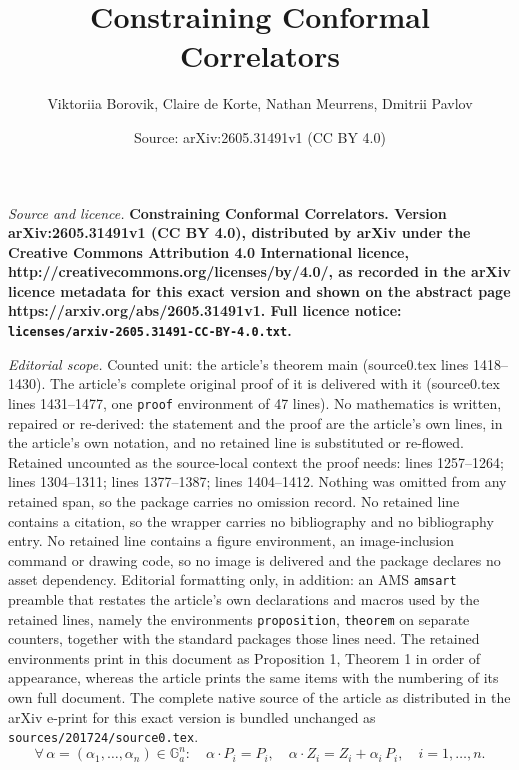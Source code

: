 \documentclass[10pt,a4paper]{amsart}
\title{\bf Constraining Conformal Correlators}
\author{Viktoriia Borovik, Claire de Korte, Nathan Meurrens, Dmitrii Pavlov}
\date{Source: arXiv:2605.31491v1 (CC BY 4.0)}
\begin{document}
\maketitle

\noindent\emph{Source and licence.} \bf Constraining Conformal Correlators. Version arXiv:2605.31491v1 (CC BY 4.0), distributed by arXiv under the Creative Commons Attribution 4.0 International licence, http://creativecommons.org/licenses/by/4.0/, as recorded in the arXiv licence metadata for this exact version and shown on the abstract page https://arxiv.org/abs/2605.31491v1. Full licence notice: \texttt{licenses/arxiv-2605.31491-CC-BY-4.0.txt}.\par\smallskip

\noindent\textit{Editorial scope.} Counted unit: the article's theorem main (source0.tex lines 1418--1430). The article's complete original proof of it is delivered with it (source0.tex lines 1431--1477, one \texttt{proof} environment of 47 lines). No mathematics is written, repaired or re-derived: the statement and the proof are the article's own lines, in the article's own notation, and no retained line is substituted or re-flowed.  Retained uncounted as the source-local context the proof needs: lines 1257--1264; lines 1304--1311; lines 1377--1387; lines 1404--1412.  Nothing was omitted from any retained span, so the package carries no omission record.  No retained line contains a citation, so the wrapper carries no bibliography and no bibliography entry.  No retained line contains a figure environment, an image-inclusion command or drawing code, so no image is delivered and the package declares no asset dependency.  Editorial formatting only, in addition: an AMS \texttt{amsart} preamble that restates the article's own declarations and macros used by the retained lines, namely the environments \texttt{proposition}, \texttt{theorem} on separate counters, together with the standard packages those lines need.  The retained environments print in this document as Proposition 1, Theorem 1 in order of appearance, whereas the article prints the same items with the numbering of its own full document.  The complete native source of the article as distributed in the arXiv e-print for this exact version is bundled unchanged as \texttt{sources/201724/source0.tex}.
\begin{equation}\label{eq:transact}
 \forall \,  \alpha = (\alpha_1,\ldots,\alpha_n) \in \mathbb{G}_a^n\colon
  \quad
 \alpha \cdot P_i = P_i,
  \quad
  \alpha \cdot Z_i = Z_i + \alpha_i\,P_i,
  \quad i=1,\ldots,n.
\end{equation}
\end{document}
